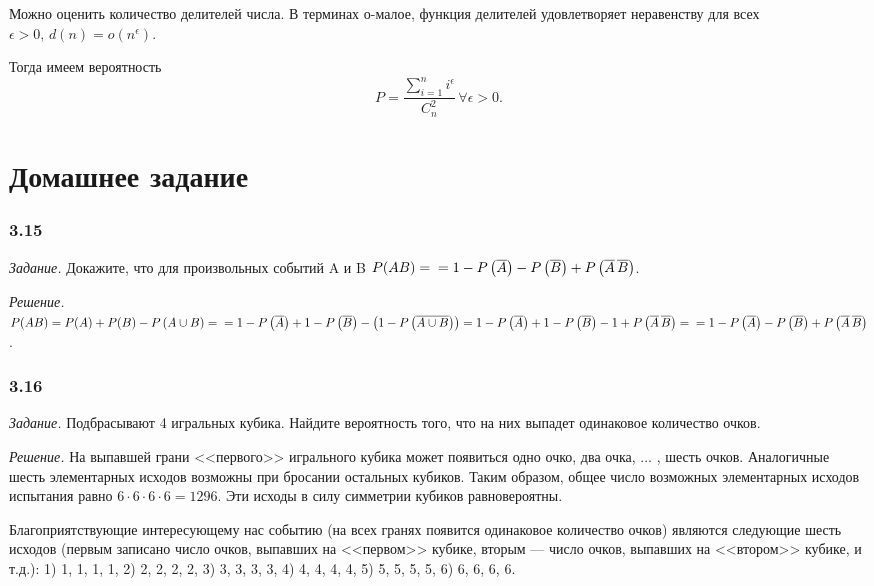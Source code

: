 \documentclass{book}
\begin{document}
Можно оценить количество делителей числа.
В терминах о-малое,
функция делителей удовлетворяет неравенству для всех $ \epsilon > 0, \, d \left( n \right) = o \left( n^{\epsilon} \right)$.

Тогда имеем вероятность
$$P =
\frac{ \sum \limits_{i=1}^n i^{\epsilon}}{C_n^2} \, \forall \epsilon > 0.$$

\section*{Домашнее задание}

\subsubsection*{3.15}

\textit{Задание.} Докажите, что для произвольных событий A и B
$ P( AB ) = \\
= 1 - P\left( \overline{ A } \right) - P \left( \overline{ B } \right) + P \left( \overline{ A } \, \overline{ B } \right) $.

\textit{Решение.}
$ P( AB ) =
P(A) + P(B) - P \left( A \cup B \right) = \\
= 1 - P \left( \overline{ A }\right) + 1 - P \left( \overline{ B } \right) - \left( 1 - P \left( \overline{ A \cup B } \right) \right) =
1 - P \left( \overline{ A } \right) + 1 - P \left( \overline{ B } \right) - 1 + P \left( \overline{ A } \, \overline{ B } \right) = \\
= 1 - P \left( \overline{ A } \right) - P \left( \overline{ B } \right) + P \left( \overline{ A } \, \overline{ B } \right) $.

\subsubsection*{3.16}

\textit{Задание.} Подбрасывают 4 игральных кубика.
Найдите вероятность того, что на них выпадет одинаковое количество очков.

\textit{Решение.} На выпавшей грани <<первого>> игрального кубика может появиться одно очко, два очка,  $ \dotsc $ , шесть очков.
Аналогичные шесть элементарных исходов возможны при бросании остальных кубиков.
Таким образом, общее число возможных элементарных исходов испытания равно $ 6 \cdot 6 \cdot 6 \cdot 6 = 1296 $.
Эти исходы в силу симметрии кубиков равновероятны.

Благоприятствующие интересующему нас событию
(на всех гранях появится одинаковое количество очков)
являются следующие шесть исходов
(первым записано число очков,
выпавших на <<первом>> кубике,
вторым --- число очков, выпавших на <<втором>> кубике, и т.д.): 1) 1, 1, 1, 1, 2) 2, 2, 2, 2, 3) 3, 3, 3, 3, 4) 4, 4, 4, 4, 5) 5, 5, 5, 5, 6) 6, 6, 6, 6.
\end{document}
